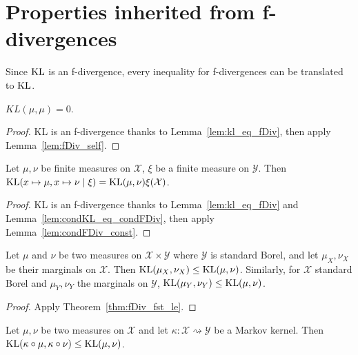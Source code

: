 \section{Properties inherited from f-divergences}

Since $\operatorname{KL}$ is an f-divergence, every inequality for f-divergences can be translated to $\operatorname{KL}$.

\begin{lemma}
  \label{lem:kl_self}
  \leanok
  $KL(\mu, \mu) = 0$.
\end{lemma}

\begin{proof} \leanok
  KL is an f-divergence thanks to Lemma~\ref{lem:kl_eq_fDiv}, then apply Lemma~\ref{lem:fDiv_self}.
\end{proof}

\begin{lemma}
  \label{lem:condKL_const}
  \leanok
  Let $\mu, \nu$ be finite measures on $\mathcal X$, $\xi$ be a finite measure on $\mathcal Y$. 
  Then $\operatorname{KL}(x \mapsto \mu, x \mapsto \nu \mid \xi) = \operatorname{KL}(\mu, \nu) \xi (\mathcal X)$.
\end{lemma}

\begin{proof} \leanok
  KL is an f-divergence thanks to Lemma~\ref{lem:kl_eq_fDiv} and Lemma~\ref{lem:condKL_eq_condFDiv}, then apply Lemma~\ref{lem:condFDiv_const}.
\end{proof}

\begin{theorem}[Marginals]
  \label{thm:kl_fst_le}
  Let $\mu$ and $\nu$ be two measures on $\mathcal X \times \mathcal Y$ where $\mathcal Y$ is standard Borel, and let $\mu_X, \nu_X$ be their marginals on $\mathcal X$.
  Then $\operatorname{KL}(\mu_X, \nu_X) \le \operatorname{KL}(\mu, \nu)$.
  Similarly, for $\mathcal X$ standard Borel and $\mu_Y, \nu_Y$ the marginals on $\mathcal Y$, $\operatorname{KL}(\mu_Y, \nu_Y) \le \operatorname{KL}(\mu, \nu)$.
\end{theorem}

\begin{proof}
Apply Theorem~\ref{thm:fDiv_fst_le}.
\end{proof}

\begin{theorem}
  \label{thm:kl_data_proc}
  Let $\mu, \nu$ be two measures on $\mathcal X$ and let $\kappa : \mathcal X \rightsquigarrow \mathcal Y$ be a Markov kernel.
  Then $\operatorname{KL}(\kappa \circ \mu, \kappa \circ \nu) \le \operatorname{KL}(\mu, \nu)$.
\end{theorem}

